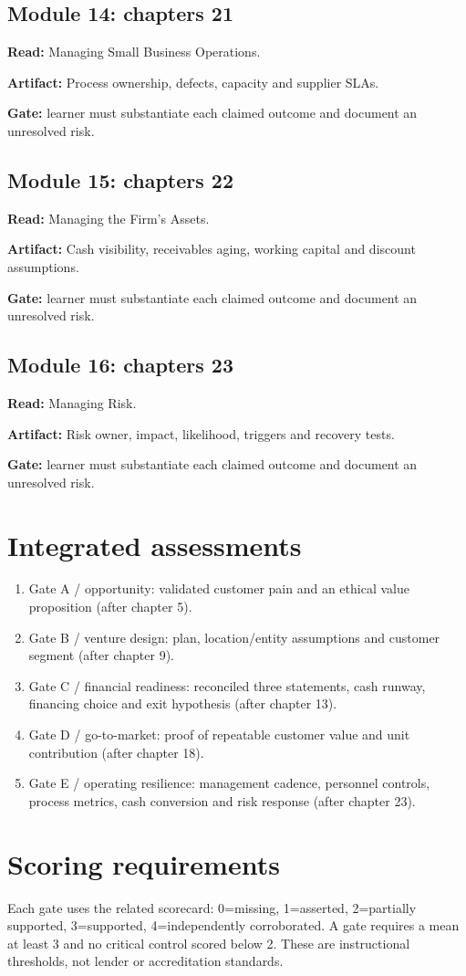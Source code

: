 \documentclass[11pt]{article}
\begin{document}
\subsection*{Module 14: chapters 21}
\textbf{Read:} Managing Small Business Operations.\par
\textbf{Artifact:} Process ownership, defects, capacity and supplier SLAs.\par
\textbf{Gate:} learner must substantiate each claimed outcome and document an unresolved risk.\par
\subsection*{Module 15: chapters 22}
\textbf{Read:} Managing the Firm’s Assets.\par
\textbf{Artifact:} Cash visibility, receivables aging, working capital and discount assumptions.\par
\textbf{Gate:} learner must substantiate each claimed outcome and document an unresolved risk.\par
\subsection*{Module 16: chapters 23}
\textbf{Read:} Managing Risk.\par
\textbf{Artifact:} Risk owner, impact, likelihood, triggers and recovery tests.\par
\textbf{Gate:} learner must substantiate each claimed outcome and document an unresolved risk.\par
\section{Integrated assessments}
\begin{enumerate}[leftmargin=*,itemsep=5pt]
\item Gate A / opportunity: validated customer pain and an ethical value proposition (after chapter 5).
\item Gate B / venture design: plan, location/entity assumptions and customer segment (after chapter 9).
\item Gate C / financial readiness: reconciled three statements, cash runway, financing choice and exit hypothesis (after chapter 13).
\item Gate D / go-to-market: proof of repeatable customer value and unit contribution (after chapter 18).
\item Gate E / operating resilience: management cadence, personnel controls, process metrics, cash conversion and risk response (after chapter 23).
\end{enumerate}

\section{Scoring requirements}
Each gate uses the related scorecard: 0=missing, 1=asserted, 2=partially supported, 3=supported, 4=independently corroborated. A gate requires a mean at least 3 and no critical control scored below 2. These are instructional thresholds, not lender or accreditation standards.
\end{document}
